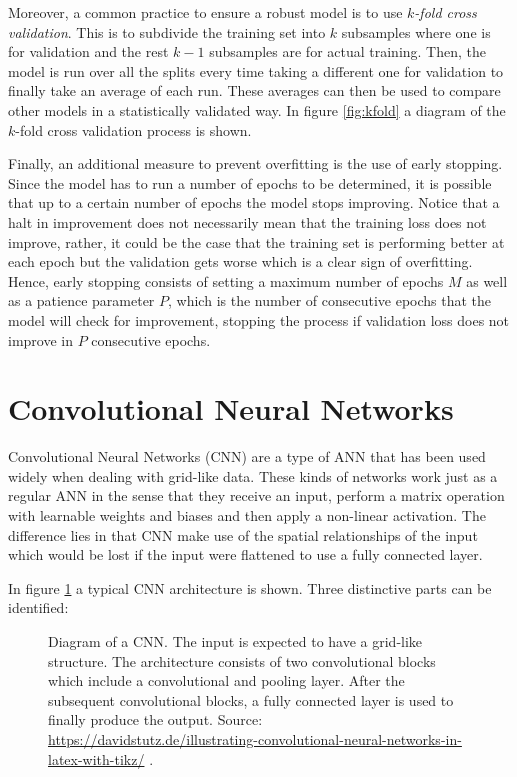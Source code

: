 Moreover, a common practice to ensure a robust model is to use \textit{$k$-fold cross validation}. This is to subdivide the training set into $k$ subsamples where one is for validation and the rest $k-1$ subsamples are for actual training. Then, the model is run over all the splits every time taking a different one for validation to finally take an average of each run. These averages can then be used to compare other models in a statistically validated way. In figure \ref{fig:kfold} a diagram of the $k$-fold cross validation process is shown.

Finally, an additional measure to prevent overfitting is the use of early stopping. Since the model has to run a number of epochs to be determined, it is possible that up to a certain number of epochs the model stops improving. Notice that a halt in improvement does not necessarily mean that the training loss does not improve, rather, it could be the case that the training set is performing better at each epoch but the validation gets worse which is a clear sign of overfitting. Hence, early stopping consists of setting a maximum number of epochs $M$ as well as a patience parameter $P$, which is the number of consecutive epochs that the model will check for improvement, stopping the process if validation loss does not improve in $P$ consecutive epochs. 

\section{Convolutional Neural Networks}

Convolutional Neural Networks (CNN) are a type of ANN that has been used widely when dealing with grid-like data. These kinds of networks work just as a regular ANN in the sense that they receive an input, perform a matrix operation with learnable weights and biases and then apply a non-linear activation. The difference lies in that CNN make use of the spatial relationships of the input which would be lost if the input were flattened to use a fully connected layer.

In figure \ref{fig:cnn} a typical CNN architecture is shown. Three distinctive parts can be identified: 

\begin{figure}
	\centering
	
	\caption[Architecture of a convolutional neural network]{Diagram of a CNN. The input is expected to have a grid-like structure.  The architecture consists of two convolutional blocks which include a convolutional and pooling layer. After the subsequent convolutional blocks, a fully connected layer is used to finally produce the output. Source: \url{https://davidstutz.de/illustrating-convolutional-neural-networks-in-latex-with-tikz/} \cite{conv-graphs}.}
	\label{fig:cnn}
\end{figure}

